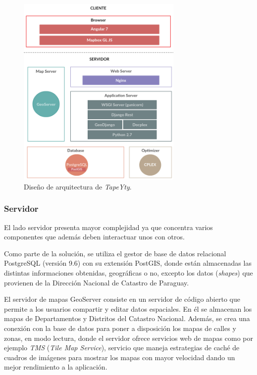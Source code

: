 \documentclass[spanish, conference]{IEEEtran}
\begin{document}
\begin{figure}[tbp]
\centerline{\includegraphics[width=8cm]{imagenes/20190424_WebAppArchitectureDesign.png}}
\caption{Diseño de arquitectura de \textit{TapeYty}.}
\label{fig:disenhoArquitectura}
\end{figure}

\subsubsection{Servidor}

El lado servidor presenta mayor complejidad ya que concentra varios componentes que además deben interactuar unos con otros.

Como parte de la solución, se utiliza el gestor de base de datos relacional PostgreSQL (versión 9.6) con su extensión PostGIS, donde están almacenadas las distintas informaciones obtenidas, geográficas o no, excepto los datos (\textit{shapes}) que provienen de la Dirección Nacional de Catastro de Paraguay.

El servidor de mapas GeoServer \cite{GeoServer} consiste en un servidor de código abierto que permite a los usuarios compartir y editar datos espaciales. En él se almacenan los mapas de Departamentos y Distritos del Catastro Nacional. Además, se crea una conexión con la base de datos para poner a disposición los mapas de calles y zonas, en modo lectura, donde el servidor ofrece servicios web de mapas como por ejemplo \textit{TMS} (\textit{Tile Map Service}), servicio que maneja estrategias de caché de cuadros de imágenes para mostrar los mapas con mayor velocidad dando un mejor rendimiento a la aplicación.
\end{document}
